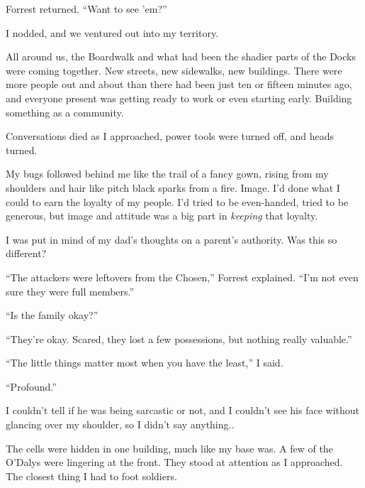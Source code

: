 Forrest returned.  ``Want to see 'em?''



I nodded, and we ventured out into my territory.



All around us, the Boardwalk and what had been the shadier parts of the Docks were coming together.  New streets, new sidewalks, new buildings.  There were more people out and about than there had been just ten or fifteen minutes ago, and everyone present was getting ready to work or even starting early.  Building something as a community.



Conversations died as I approached, power tools were turned off, and heads turned.



My bugs followed behind me like the trail of a fancy gown, rising from my shoulders and hair like pitch black sparks from a fire.  Image.  I'd done what I could to earn the loyalty of my people.  I'd tried to be even-handed, tried to be generous, but image and attitude was a big part in \emph{keeping} that loyalty.



I was put in mind of my dad's thoughts on a parent's authority.  Was this so different?



``The attackers were leftovers from the Chosen,'' Forrest explained.  ``I'm not even sure they were full members.''



``Is the family okay?''



``They're okay.  Scared, they lost a few possessions, but nothing really valuable.''



``The little things matter most when you have the least,'' I said.



``Profound.''



I couldn't tell if he was being sarcastic or not, and I couldn't see his face without glancing over my shoulder, so I didn't say anything..



The cells were hidden in one building, much like my base was.  A few of the O'Dalys were lingering at the front.  They stood at attention as I approached.  The closest thing I had to foot soldiers.



